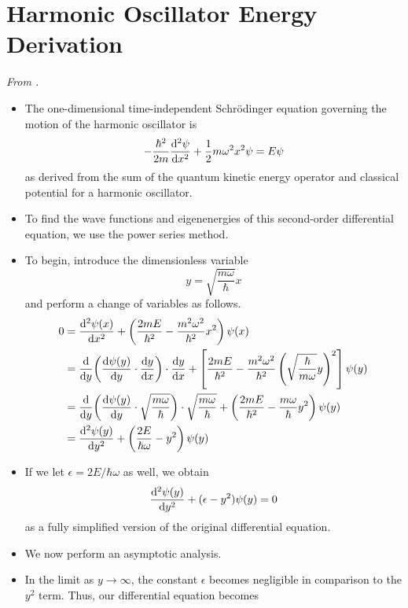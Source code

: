 \documentclass[../notes.tex]{subfiles}
\begin{document}
\section{Harmonic Oscillator Energy Derivation}
\emph{From \textcite{bib:HarmonicOscillator}.}
\begin{itemize}
    \item {}The one-dimensional time-independent Schr\"{o}dinger equation governing the motion of the harmonic oscillator is
    \begin{equation*}
        -\frac{\hbar^2}{2m}\dv[2]{\psi}{x}+\frac{1}{2}m\omega^2x^2\psi = E\psi
    \end{equation*}
    as derived from the sum of the quantum kinetic energy operator and classical potential for a harmonic oscillator.
    \item To find the wave functions and eigenenergies of this second-order differential equation, we use the power series method.
    \item To begin, introduce the dimensionless variable
    \begin{equation*}
        y = \sqrt{\frac{m\omega}{\hbar}}x
    \end{equation*}
    and perform a change of variables as follows.
    \begin{align*}
        0 &= \dv[2]{\psi(x)}{x}+\left( \frac{2mE}{\hbar^2}-\frac{m^2\omega^2}{\hbar^2}x^2 \right)\psi(x)\\
        &= \dv{y}(\dv{\psi(y)}{y}\cdot\dv{y}{x})\cdot\dv{y}{x}+\left[ \frac{2mE}{\hbar^2}-\frac{m^2\omega^2}{\hbar^2}\left( \sqrt{\frac{\hbar}{m\omega}}y \right)^2 \right]\psi(y)\\
        &= \dv{y}(\dv{\psi(y)}{y}\cdot\sqrt{\frac{m\omega}{\hbar}})\cdot\sqrt{\frac{m\omega}{\hbar}}+\left( \frac{2mE}{\hbar^2}-\frac{m\omega}{\hbar}y^2 \right)\psi(y)\\
        &= \dv[2]{\psi(y)}{y}+\left( \frac{2E}{\hbar\omega}-y^2 \right)\psi(y)
    \end{align*}
    \item If we let $\epsilon=2E/\hbar\omega$ as well, we obtain
    \begin{equation*}
        \dv[2]{\psi(y)}{y}+(\epsilon-y^2)\psi(y) = 0
    \end{equation*}
    as a fully simplified version of the original differential equation.
    \item We now perform an asymptotic analysis.
    \item In the limit as $y\to\infty$, the constant $\epsilon$ becomes negligible in comparison to the $y^2$ term. Thus, our differential equation becomes

\end{itemize}
\end{document}
